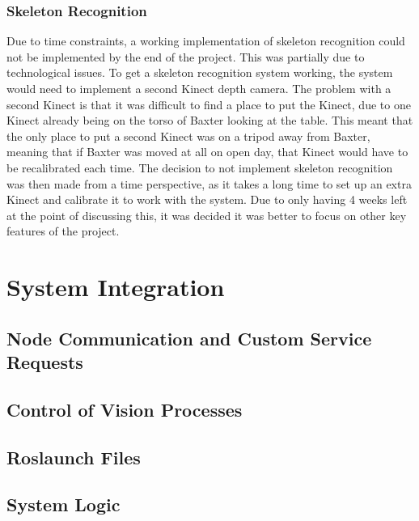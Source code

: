 \subsubsection{Skeleton Recognition}
Due to time constraints, a working implementation of skeleton recognition could not be implemented by the end of the project. This was partially due to technological issues. To get a skeleton recognition system working, the system would need to implement a second Kinect depth camera. The problem with a second Kinect is that it was difficult to find a place to put the Kinect, due to one Kinect already being on the torso of Baxter looking at the table. This meant that the only place to put a second Kinect was on a tripod away from Baxter, meaning that if Baxter was moved at all on open day, that Kinect would have to be recalibrated each time. The decision to not implement skeleton recognition was then made from a time perspective, as it takes a long time to set up an extra Kinect and calibrate it to work with the system. Due to only having 4 weeks left at the point of discussing this, it was decided it was better to focus on other key features of the project.
\section{System Integration}
\subsection{Node Communication and Custom Service Requests}
\subsection{Control of Vision Processes}
\subsection{Roslaunch Files}
\subsection{System Logic}
~\cite{kinectfusion}
~\cite{objectlabelling}
~\cite{herbrobot}
~\cite{reliablegrasping}